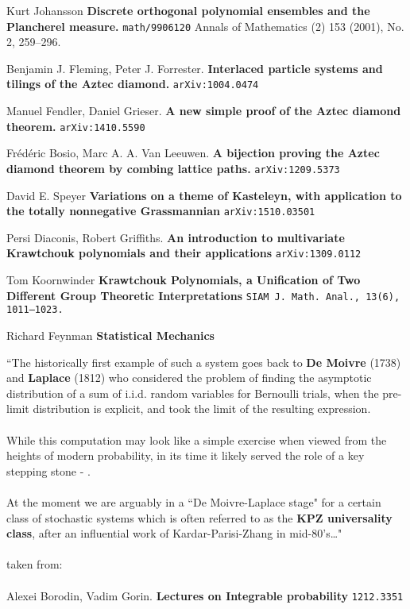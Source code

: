 \documentclass[12pt]{article}
\begin{document}
\begin{thebibliography}{}

\item Kurt Johansson \textbf{Discrete orthogonal polynomial ensembles and the Plancherel measure.} \texttt{math/9906120} Annals of Mathematics (2) 153 (2001), No. 2, 259--296.

\item Benjamin J. Fleming, Peter J. Forrester.  \textbf{Interlaced particle systems and tilings of the Aztec diamond.} \texttt{arXiv:1004.0474}

\item Manuel Fendler, Daniel Grieser.	 \textbf{A new simple proof of the Aztec diamond theorem.}  \texttt{arXiv:1410.5590} 

\item Fr\'{e}d\'{e}ric Bosio, Marc A. A. Van Leeuwen.  \textbf{A bijection proving the Aztec diamond theorem by combing lattice paths.} \texttt{arXiv:1209.5373}

\item David E. Speyer \textbf{Variations on a theme of Kasteleyn, with application to the totally nonnegative Grassmannian} \texttt{arXiv:1510.03501}

\item Persi Diaconis, Robert Griffiths.  \textbf{An introduction to multivariate Krawtchouk polynomials and their applications} \texttt{arXiv:1309.0112}

\item Tom Koornwinder \textbf{Krawtchouk Polynomials, a Unification of Two Different Group Theoretic Interpretations}
\texttt{SIAM J. Math. Anal., 13(6), 1011–1023.}

\item Richard Feynman \textbf{Statistical Mechanics} 

\end{thebibliography}

\newpage

\newpage

\selectfont \fontsize{20}{20}\selectfont

``The historically first example of such a system goes back to \textbf{De Moivre} (1738) and
\textbf{Laplace} (1812) who considered the problem of finding the asymptotic distribution of a sum
of i.i.d. random variables for Bernoulli trials, when the pre-limit distribution is explicit,
and took the limit of the resulting expression. \\ \\ 
\indent While this computation may look like a
simple exercise when viewed from the heights of modern probability, in its time it likely
served the role of a key stepping stone - {\color{blue!50!white!80!black}{first rigorous proofs of central limit theorems
appeared only in the beginning of the XXth century}}. \\ \\
\indent At the moment we are arguably in a ``De Moivre-Laplace stage" for a certain class
of stochastic systems which is often referred to as the \textbf{KPZ universality class}, after an
influential work of Kardar-Parisi-Zhang in mid-80's\dots" \\ \\

\selectfont \fontsize{25}{30}\selectfont
\noindent taken from: \\ \\
\selectfont \fontsize{20}{15}\selectfont
Alexei Borodin, Vadim Gorin.  \textbf{Lectures on Integrable probability} \texttt{1212.3351}
\end{document}
